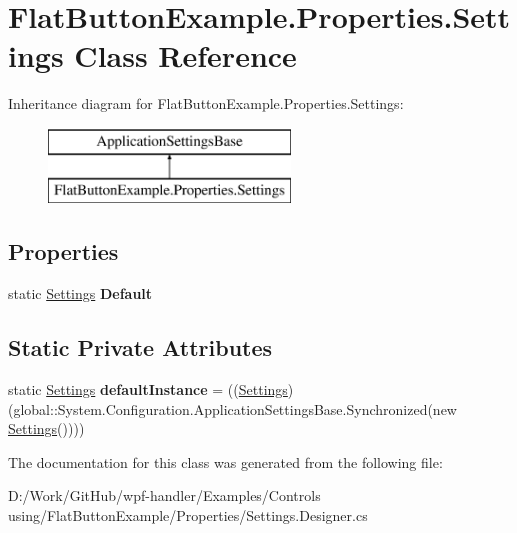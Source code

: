 \hypertarget{class_flat_button_example_1_1_properties_1_1_settings}{}\section{Flat\+Button\+Example.\+Properties.\+Settings Class Reference}
\label{class_flat_button_example_1_1_properties_1_1_settings}
Inheritance diagram for Flat\+Button\+Example.\+Properties.\+Settings\+:\begin{figure}[H]
\begin{center}
\leavevmode
\includegraphics[height=2.000000cm]{d8/dba/class_flat_button_example_1_1_properties_1_1_settings}
\end{center}
\end{figure}
\subsection*{Properties}
\begin{DoxyCompactItemize}
\item 
\mbox{\label{class_flat_button_example_1_1_properties_1_1_settings_a5867680e2a5d0e6b737f63d962c7eee2}} 
static \mbox{\hyperlink{class_flat_button_example_1_1_properties_1_1_settings}{Settings}} {\bfseries Default}
\end{DoxyCompactItemize}
\subsection*{Static Private Attributes}
\begin{DoxyCompactItemize}
\item 
\mbox{\label{class_flat_button_example_1_1_properties_1_1_settings_a710ccf62e43bd0b45ab435fd1a09b881}} 
static \mbox{\hyperlink{class_flat_button_example_1_1_properties_1_1_settings}{Settings}} {\bfseries default\+Instance} = ((\mbox{\hyperlink{class_flat_button_example_1_1_properties_1_1_settings}{Settings}})(global\+::\+System.\+Configuration.\+Application\+Settings\+Base.\+Synchronized(new \mbox{\hyperlink{class_flat_button_example_1_1_properties_1_1_settings}{Settings}}())))
\end{DoxyCompactItemize}


The documentation for this class was generated from the following file\+:\begin{DoxyCompactItemize}
\item 
D\+:/\+Work/\+Git\+Hub/wpf-\/handler/\+Examples/\+Controls using/\+Flat\+Button\+Example/\+Properties/Settings.\+Designer.\+cs\end{DoxyCompactItemize}
